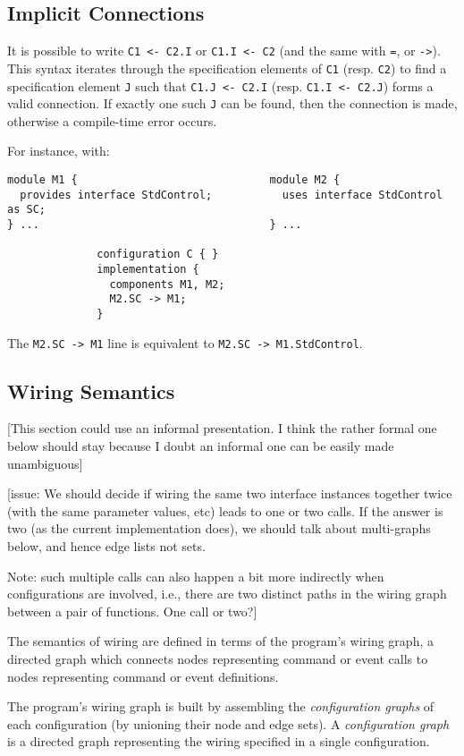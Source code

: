 \documentclass[11pt]{article}
\newcommand{\kw}[1]{{\tt #1}}
\newcommand{\code}[1]{{\tt #1}}
\begin{document}
\subsection{Implicit Connections}
\label{sec:implicit}

It is possible to write \code{C1 <- C2.I} or \code{C1.I <- C2} (and the
same with \kw{=}, or \kw{->}). This syntax iterates through the
specification elements of \code{C1} (resp. \code{C2}) to find a
specification element \code{J} such that \code{C1.J <- C2.I}
(resp. \code{C1.I <- C2.J}) forms a valid connection. If exactly one such
\code{J} can be found, then the connection is made, otherwise a
compile-time error occurs.

For instance, with:
\begin{verbatim}
module M1 {                              module M2 {
  provides interface StdControl;           uses interface StdControl as SC;
} ...                                    } ...

              configuration C { }
              implementation {
                components M1, M2;
                M2.SC -> M1;
              }
\end{verbatim}
The \code{M2.SC -> M1} line is equivalent to \code{M2.SC -> M1.StdControl}.

\subsection{Wiring Semantics}
\label{sec:wiring}

[This section could use an informal presentation. I think the rather
formal one below should stay because I doubt an informal one can be
easily made unambiguous]

[issue: We should decide if wiring the same two interface instances
together twice (with the same parameter values, etc) leads to one or two
calls. If the answer is two (as the current implementation does), we should
talk about multi-graphs below, and hence edge lists not sets.

Note: such multiple calls can also happen a bit more indirectly when
configurations are involved, i.e., there are two distinct paths in
the wiring graph between a pair of functions. One call or two?]

The semantics of wiring are defined in terms of the program's wiring graph,
a directed graph which connects nodes representing command or event calls
to nodes representing command or event definitions.

The program's wiring graph is built by assembling the \emph{configuration
graphs} of each configuration (by unioning their node and edge sets).
A \emph{configuration graph} is a directed graph representing the wiring
specified in a single configuration.
\end{document}
